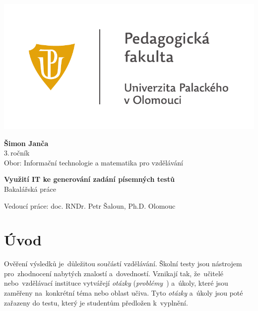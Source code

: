 \documentclass[11pt,a4paper]{report}
\begin{document}
	\begin{titlepage}
		\begin{center}
            {
            \centering
            \includegraphics[]{./img/UP_logo_PdF-UP_horizont_cz.pdf}
            }
			
			\vspace{3cm}

            {
                \LARGE
                \textbf{Šimon Janča}\\
                3.\,ročník\\[8mm]
                Obor: Informační technologie a matematika pro vzdělávání
            }

            \vspace{4cm}
			
			{
			    \textbf{\Huge Využití IT ke generování zadání písemných testů}\\[4mm]
			    \Large
			    Bakalářská práce
			}

            \vfill
            
            {
                Vedoucí práce:
                doc. RNDr. Petr Šaloun, Ph.D.
                \hfill
    			Olomouc \the\year{}
            }
			
		\end{center}
	\end{titlepage}
	\tableofcontents

	\newpage
    \clearpage
    \setcounter{page}{1}
	
	\chapter{Úvod}
        Ověření výsledků je~důležitou součástí vzdělávání. Školní testy jsou nástrojem pro~zhodnocení nabytých znalostí a~dovedností. Vznikají tak, že~učitelé nebo~vzdělávací instituce vytvářejí \emph{otázky} (\emph{problémy}~\cite{zhouf:tvorbamatproblemu}) a~úkoly, které jsou zaměřeny na~konkrétní téma nebo oblast učiva. Tyto \emph{otázky} a~úkoly jsou poté zařazeny do testu, který je studentům předložen k~vyplnění.
\end{document}
